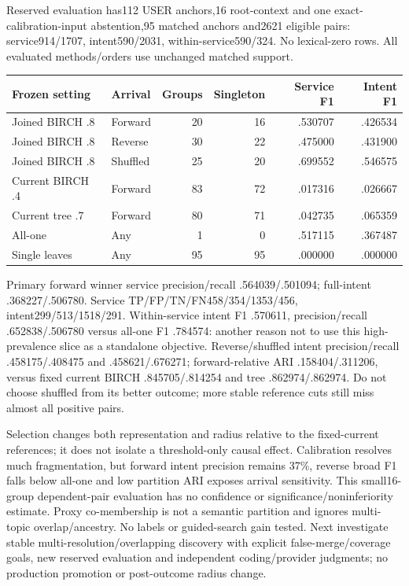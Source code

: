 \documentclass[11pt]{article}
\begin{document}
Reserved evaluation has112 USER anchors,16 root-context and one
exact-calibration-input abstention,95 matched anchors and2621 eligible pairs:
service914/1707, intent590/2031, within-service590/324. No lexical-zero rows.
All evaluated methods/orders use unchanged matched support.
\begin{center}
\small
\begin{tabular}{llrrrr}
\toprule
Frozen setting & Arrival & Groups & Singleton & Service F1 & Intent F1 \\
\midrule
Joined BIRCH .8 & Forward & 20 & 16 & .530707 & .426534 \\
Joined BIRCH .8 & Reverse & 30 & 22 & .475000 & .431900 \\
Joined BIRCH .8 & Shuffled & 25 & 20 & .699552 & .546575 \\
Current BIRCH .4 & Forward & 83 & 72 & .017316 & .026667 \\
Current tree .7 & Forward & 80 & 71 & .042735 & .065359 \\
All-one & Any & 1 & 0 & .517115 & .367487 \\
Single leaves & Any & 95 & 95 & .000000 & .000000 \\
\bottomrule
\end{tabular}
\end{center}
Primary forward winner service precision/recall .564039/.501094; full-intent
.368227/.506780. Service TP/FP/TN/FN458/354/1353/456, intent299/513/1518/291.
Within-service intent F1 .570611, precision/recall .652838/.506780 versus
all-one F1 .784574: another reason not to use this high-prevalence slice as a
standalone objective. Reverse/shuffled intent precision/recall .458175/.408475
and .458621/.676271; forward-relative ARI .158404/.311206, versus fixed current
BIRCH .845705/.814254 and tree .862974/.862974. Do not choose shuffled from its
better outcome; more stable reference cuts still miss almost all positive pairs.

Selection changes both representation and radius relative to the fixed-current
references; it does not isolate a threshold-only causal effect.
Calibration resolves much fragmentation, but forward intent precision remains
37\%, reverse broad F1 falls below all-one and low partition ARI exposes arrival
sensitivity. This small16-group dependent-pair evaluation has no confidence or
significance/noninferiority estimate. Proxy co-membership is not a semantic
partition and ignores multi-topic overlap/ancestry. No labels or guided-search
gain tested. Next investigate stable multi-resolution/overlapping discovery with
explicit false-merge/coverage goals, new reserved evaluation and independent
coding/provider judgments; no production promotion or post-outcome radius change.
\end{document}
